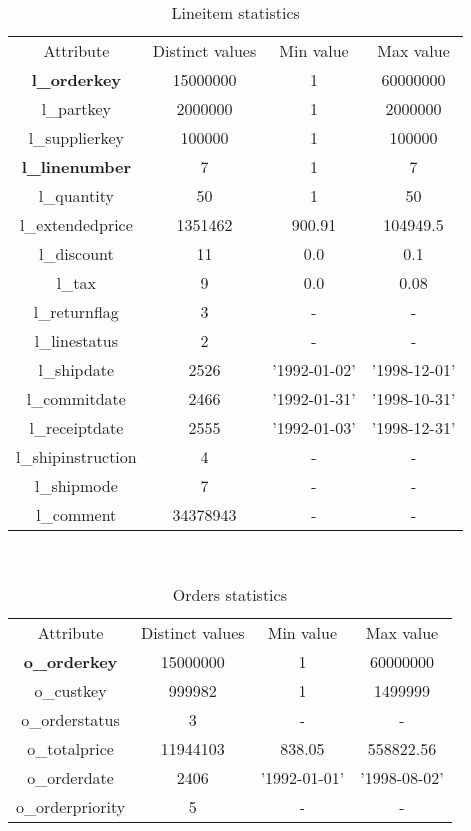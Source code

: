 \begin{table}[H]
\centering
\begin{tabular}{c|c|c|c} 
\rowcolor{blue!50} Attribute & Distinct values & Min value & Max value \\
\rowcolor{gray!10} \textbf{l\_orderkey} & 15000000 & 1 & 60000000 \\ 
\rowcolor{white} l\_partkey & 2000000 & 1 & 2000000 \\
\rowcolor{gray!10} l\_supplierkey & 100000 & 1 & 100000 \\
\rowcolor{white} \textbf{l\_linenumber} & 7 & 1 & 7 \\
\rowcolor{gray!10} l\_quantity & 50 & 1 & 50 \\
\rowcolor{white} l\_extendedprice & 1351462 & 900.91 & 104949.5 \\
\rowcolor{gray!10} l\_discount & 11 & 0.0 & 0.1 \\
\rowcolor{white} l\_tax & 9 & 0.0 & 0.08 \\
\rowcolor{gray!10} l\_returnflag & 3 & - & - \\
\rowcolor{white} l\_linestatus & 2 & - & - \\
\rowcolor{gray!10} l\_shipdate & 2526 & '1992-01-02' & '1998-12-01' \\
\rowcolor{white} l\_commitdate & 2466 & '1992-01-31' & '1998-10-31' \\
\rowcolor{gray!10} l\_receiptdate & 2555 & '1992-01-03' & '1998-12-31' \\
\rowcolor{white} l\_shipinstruction & 4 & - & - \\
\rowcolor{gray!10} l\_shipmode & 7 & - & -\\
\rowcolor{white} l\_comment & 34378943 & - & - \\
\end{tabular}\\[0.5cm]
    \caption{Lineitem statistics}
\end{table}

\begin{table}[H]
\centering
\begin{tabular}{c|c|c|c} 
\rowcolor{blue!50} Attribute & Distinct values & Min value & Max value \\
\rowcolor{gray!10} \textbf{o\_orderkey} & 15000000 & 1 & 60000000 \\
\rowcolor{white} o\_custkey & 999982 & 1 & 1499999 \\
\rowcolor{gray!10} o\_orderstatus & 3 & - & - \\
\rowcolor{white} o\_totalprice & 11944103 & 838.05 & 558822.56 \\
\rowcolor{gray!10} o\_orderdate & 2406 & '1992-01-01' & '1998-08-02' \\
\rowcolor{white} o\_orderpriority & 5 & - & - \\
\end{tabular}\\[0.5cm] 
    \caption{Orders statistics}
\end{table}

